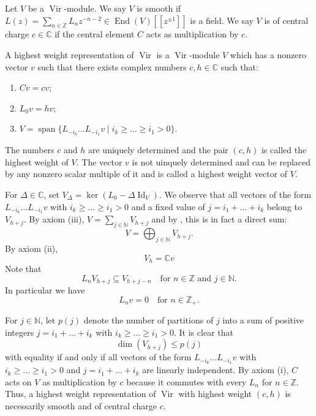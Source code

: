 \documentclass[a4paper, 12pt, reqno]{amsart}
\theoremstyle{remark}
\numberwithin{equation}{subsection}
\DeclareMathOperator{\Vir}{Vir}
\DeclareMathOperator{\Id}{Id}
\DeclareMathOperator{\End}{End}
\DeclareMathOperator{\vspan}{span}
\begin{document}
Let $V$ be a $\Vir$-module.
We say $V$ is smooth if $L(z) = \sum_{n \in \mathbb{Z}}L_{n}z^{-n - 2} \in \End(V)[[z^{\pm 1}]]$ is a field.
We say $V$ is of central charge $c \in \mathbb{C}$ if the central element $C$ acts as multiplication by $c$.

A highest weight representation of $\Vir$ is a $\Vir$-module $V$ which has a nonzero vector $v$ such that there exists complex numbers $c, h \in \mathbb{C}$ such that:
\begin{enumerate}
  \item $Cv = cv$; 
  \item $L_0v = hv$;
  \item $V = \vspan\{L_{-i_k}\dots L_{-i_1}v \mid i_k \ge \dots \ge i_1 > 0\}$.
\end{enumerate}
The numbers $c$ and $h$ are uniquely determined and the pair $(c, h)$ is called the highest weight of $V$.
The vector $v$ is not uinquely determined and can be replaced by any nonzero scalar multiple of it and is called a highest weight vector of $V$.

For $\Delta \in \mathbb{C}$, set $V_{\Delta} = \ker(L_0 - \Delta\Id_V)$.
We observe that all vectors of the form $L_{-i_k}\dots L_{-i_1}v$ with $i_k \ge \dots \ge i_1 > 0$ and a fixed value of $j = i_1 + \dots + i_k$ belong to $V_{h + j}$.
By axiom (iii), $V = \sum_{j \in \mathbb{N}}V_{h + j}$ and by , this is in fact a direct sum:
\begin{equation}
  \label{eq:30}
  V = \bigoplus_{j \in \mathbb{N}}V_{h + j}.
\end{equation}
By axiom (ii),
\begin{equation}
  \label{eq:31}
  V_h = \mathbb{C}v
\end{equation}
Note that
\begin{equation}
  \label{eq:32}
  L_nV_{h + j}\subseteq V_{h + j - n} \quad \text{for }n \in \mathbb{Z}\text{ and }j \in \mathbb{N}.
\end{equation}
In particular we have
\begin{equation}
  \label{eq:33}
  L_nv = 0 \quad \text{for } n \in \mathbb{Z}_+.
\end{equation}

For $j \in \mathbb{N}$, let $p(j)$ denote the number of partitions of $j$ into a sum of positive integers $j = i_1 + \dots + i_k$ with $i_k \ge \dots \ge i_1 > 0$.
It is clear that
\begin{equation}
  \label{eq:34}
  \dim(V_{h + j}) \le p(j)
\end{equation}
with equality if and only if all vectors of the form $L_{-i_k}\dots L_{-i_1}v$ with $i_k \ge \dots \ge i_1 > 0$ and $j = i_1 + \dots + i_k$ are linearly independent.
By axiom (i), $C$ acts on $V$ as multiplication by $c$ because it commutes with every $L_n$ for $n \in \mathbb{Z}$.
Thus, a highest weight representation of $\Vir$ with highest weight $(c, h)$ is necessarily smooth and of central charge $c$.
\end{document}

